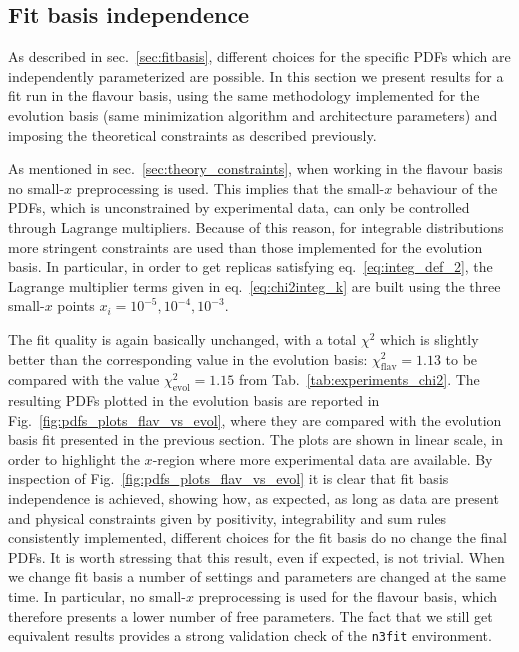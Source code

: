 \subsection{Fit basis independence}
As described in sec.~\ref{sec:fitbasis}, different choices for the specific PDFs which are independently
parameterized are possible.
In this section we present results for a fit run in the flavour basis, using the same methodology
implemented for the evolution basis (same minimization algorithm and architecture parameters) 
and imposing the theoretical constraints as described previously.

%
As mentioned in sec.~\ref{sec:theory_constraints}, when working in the flavour basis 
no small-$x$ preprocessing is used. This implies that the small-$x$ behaviour of the PDFs, which is unconstrained 
by experimental data, can only be controlled through Lagrange multipliers.
Because of this reason, for integrable distributions more stringent constraints are used than those implemented
for the evolution basis. In particular, in order to get replicas satisfying eq.~\eqref{eq:integ_def_2},
the Lagrange multiplier terms given in eq.~\eqref{eq:chi2integ_k} are built using the three small-$x$
points $x_i = 10^{-5}, 10^{-4}, 10^{-3}$. 

%
The fit quality is again basically unchanged, with a total $\chi^2$ which is slightly better than the corresponding 
value in the evolution basis: $\chi_{\text{flav}}^2=1.13$ to be compared with the value $\chi_{\text{evol}}^2=1.15$ 
from Tab.~\ref{tab:experiments_chi2}.
The resulting PDFs plotted in the evolution basis are reported in Fig.~\ref{fig:pdfs_plots_flav_vs_evol}, 
where they are compared with the evolution basis fit presented in the previous section.
The plots are shown in linear scale, in order to highlight the $x$-region where more experimental data are available.
By inspection of Fig.~\ref{fig:pdfs_plots_flav_vs_evol} it is clear that fit basis independence is achieved,
showing how, as expected, as long as data are present and physical constraints given by positivity, integrability and sum rules
consistently implemented, different choices for the fit basis do no change the final PDFs.
It is worth stressing that this result, even if expected, is not trivial. When we change fit basis a number
of settings and parameters are changed at the same time. In particular, no small-$x$ preprocessing
is used for the flavour basis, which therefore presents a lower number of free parameters.
The fact that we still get equivalent results provides a strong validation check of the {\tt n3fit} environment.

